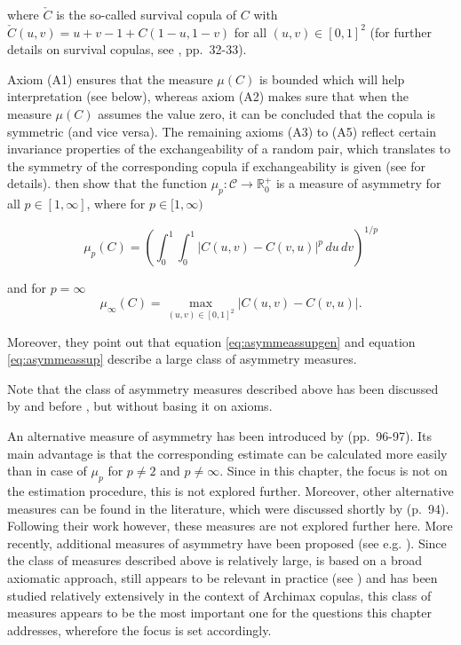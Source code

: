 \documentclass[
]{krantz}
\begin{document}
where \(\check{C}\) is the so-called survival copula of \(C\) with \(\check{C}(u,v) = u + v - 1 + C(1-u, 1-v)\) for all \((u,v) \in [0,1]^2\) (for further details on survival copulas, see \citet{durante2016}, pp.~32-33).

Axiom (A1) ensures that the measure \(\mu(C)\) is bounded which will help interpretation (see below), whereas axiom (A2) makes sure that when the measure \(\mu(C)\) assumes the value zero, it can be concluded that the copula is symmetric (and vice versa). The remaining axioms (A3) to (A5) reflect certain invariance properties of the exchangeability of a random pair, which translates to the symmetry of the corresponding copula if exchangeability is given (see \citet{durante2010a} for details).
\citet{durante2010a} then show that the function \(\mu_p:\mathcal{C}\rightarrow \mathbb{R}^+_0\) is a measure of asymmetry for all \(p \in [1, \infty]\), where for \(p \in [1, \infty)\)

\begin{equation}
\mu_p(C) = \left( \int_0^1 \int_0^1 |C(u, v) - C(v, u)|^p \, du \, dv \right)^{1/p}
\label{eq:asymmeassupgen}
\end{equation}

and for \(p = \infty\)
\begin{equation}
\mu_{\infty}(C) = \max_{(u,v) \in [0,1]^2} |C(u, v) - C(v, u)|.
\label{eq:asymmeassup}
\end{equation}

Moreover, they point out that equation \eqref{eq:asymmeassupgen} and equation \eqref{eq:asymmeassup} describe a large class of asymmetry measures.

Note that the class of asymmetry measures described above has been discussed by \citet{klement2006} and \citet{nelsen2007} before \citet{durante2010a}, but without basing it on axioms.

An alternative measure of asymmetry has been introduced by \citet{genest2013} (pp.~96-97). Its main advantage is that the corresponding estimate can be calculated more easily than in case of \(\mu_p\) for \(p \neq 2\) and \(p \neq \infty\). Since in this chapter, the focus is not on the estimation procedure, this is not explored further. Moreover, other alternative measures can be found in the literature, which were discussed shortly by \citet{genest2013} (p.~94). Following their work however, these measures are not explored further here. More recently, additional measures of asymmetry have been proposed (see e.g. \citet{kamnitui2018}). Since the class of measures described above is relatively large, is based on a broad axiomatic approach, still appears to be relevant in practice (see \citet{lin2020}) and has been studied relatively extensively in the context of Archimax copulas, this class of measures appears to be the most important one for the questions this chapter addresses, wherefore the focus is set accordingly.
\end{document}
